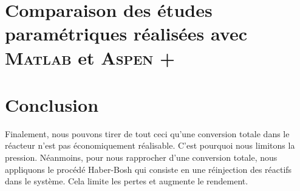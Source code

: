 \documentclass[11pt,a4paper]{report}
\begin{document}
\section{Comparaison des études paramétriques réalisées avec \textsc{Matlab} et \textsc{Aspen +}}

\section{Conclusion} Finalement, nous pouvons tirer de tout ceci qu'une conversion totale dans le réacteur n'est
pas économiquement réalisable. C'est pourquoi nous limitons la pression. Néanmoins, pour nous rapprocher d'une 
conversion totale, nous appliquons le procédé Haber-Bosh qui consiste en une réinjection des réactifs dans le système. 
Cela limite les pertes et augmente le rendement.
\end{document}
